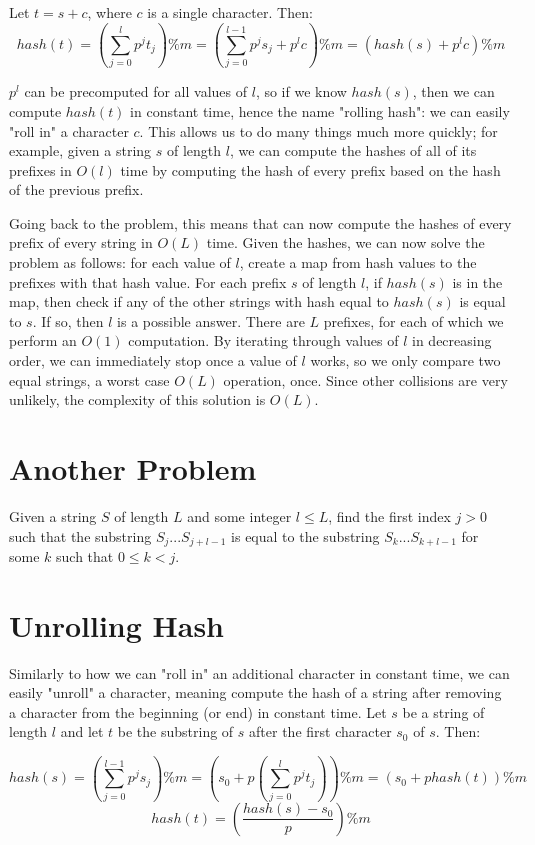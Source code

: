 \documentclass{article}
\begin{document}
Let $t = s + c$, where $c$ is a single character. Then:
$$hash(t) = (\sum_{j = 0}^l p^j t_j) \% m = (\sum_{j = 0}^{l - 1} p^j s_j + p^l c) \% m = (hash(s) + p^l c) \% m$$

$p^l$ can be precomputed for all values of $l$, so if we know $hash(s)$, then we can compute $hash(t)$ in constant time, hence the name "rolling hash": we can easily "roll in" a character $c$. This allows us to do many things much more quickly; for example, given a string $s$ of length $l$, we can compute the hashes of all of its prefixes in $O(l)$ time by computing the hash of every prefix based on the hash of the previous prefix.

Going back to the problem, this means that can now compute the hashes of every prefix of every string in $O(L)$ time. Given the hashes, we can now solve the problem as follows: for each value of $l$, create a map from hash values to the prefixes with that hash value. For each prefix $s$ of length $l$, if $hash(s)$ is in the map, then check if any of the other strings with hash equal to $hash(s)$ is equal to $s$. If so, then $l$ is a possible answer.  There are $L$ prefixes, for each of which we perform an $O(1)$ computation. By iterating through values of $l$ in decreasing order, we can immediately stop once a value of $l$ works, so we only compare two equal strings, a worst case $O(L)$ operation, once. Since other collisions are very unlikely, the complexity of this solution is $O(L)$.

\section{Another Problem}
Given a string $S$ of length $L$ and some integer $l \leq L$, find the first index $j > 0$ such that the substring $S_j...S_{j + l - 1}$ is equal to the substring $S_k...S_{k + l - 1}$ for some $k$ such that $0 \leq k < j$.

\section{Unrolling Hash}
Similarly to how we can "roll in" an additional character in constant time, we can easily "unroll" a character, meaning compute the hash of a string after removing a character from the beginning (or end) in constant time. Let $s$ be a string of length $l$ and let $t$ be the substring of $s$ after the first character $s_0$ of $s$. Then:

$$hash(s) = (\sum_{j = 0}^{l - 1}p^j s_j) \% m = (s_0 + p(\sum_{j = 0}^l p^j t_j)) \% m = (s_0 + p hash(t)) \% m$$
$$hash(t) = (\frac {hash(s) - s_0} p) \% m$$
\end{document}

